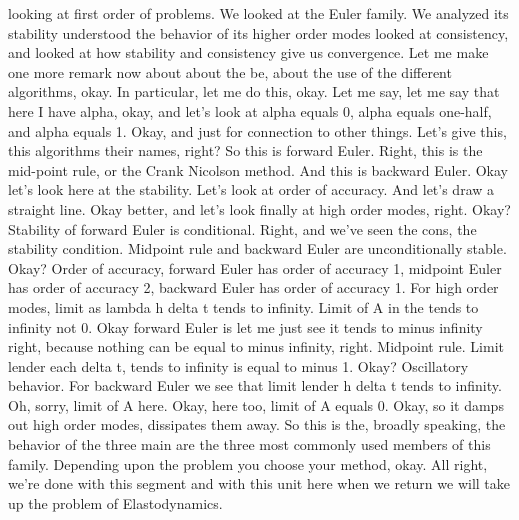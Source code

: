 \documentclass[10pt]{article}
\begin{document}
looking at first order of problems. We looked at the Euler family. We analyzed its stability understood the behavior of its higher order modes looked at consistency, and looked at how stability and consistency give us convergence. Let me make one more remark now about about the be, about the use of the different algorithms, okay. In particular, let me do this, okay. Let me say, let me say that here I have alpha, okay, and let's look at alpha equals 0, alpha equals one-half, and alpha equals 1. Okay, and just for connection to other things. Let's give this, this algorithms their names, right? So this is forward Euler. Right, this is the mid-point rule, or the Crank Nicolson method. And this is backward Euler. Okay let's look here at the stability. Let's look at order of accuracy. And let's draw a straight line. Okay better, and let's look finally at high order modes, right. Okay? Stability of forward Euler is conditional. Right, and we've seen the cons, the stability condition. Midpoint rule and backward Euler are unconditionally stable. Okay? Order of accuracy, forward Euler has order of accuracy 1, midpoint Euler has order of accuracy 2, backward Euler has order of accuracy 1. For high order modes, limit as lambda h delta t tends to infinity. Limit of A in the tends to infinity not 0. Okay forward Euler is let me just see it tends to minus infinity right, because nothing can be equal to minus infinity, right. Midpoint rule. Limit lender each delta t, tends to infinity is equal to minus 1. Okay? Oscillatory behavior. For backward Euler we see that limit lender h delta t tends to infinity. Oh, sorry, limit of A here. Okay, here too, limit of A equals 0. Okay, so it damps out high order modes, dissipates them away. So this is the, broadly speaking, the behavior of the three main are the three most commonly used members of this family. Depending upon the problem you choose your method, okay. All right, we're done with this segment and with this unit here when we return we will take up the problem of Elastodynamics.
\end{document}

